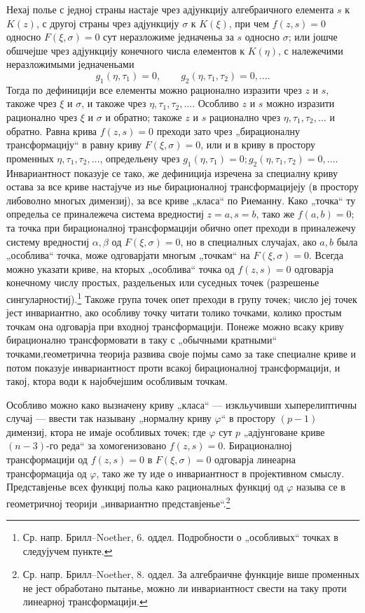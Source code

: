 ﻿\documentclass[11pt]{article}
\begin{document}
Нехај полье с једној страны настаје чрез адјункцију алгебраичного елемента \(s\) к \(K(z)\), с другој страны чрез адјункцију \(\sigma\) к \(K(\xi)\), при чем \(f(z,s)=0\) односно \(F(\xi,\sigma)=0\) сут неразложиме једначеньа за \(s\) односно \(\sigma\); или јошче обшчејше чрез адјункцију конечного числа елементов к \(K(\eta)\), с належечими неразложимыми једначеньами
\[
g_1(\eta,\tau_1)=0,\qquad g_2(\eta,\tau_1,\tau_2)=0,\ldots .
\]
Тогда по дефиницији все елементы можно рационално изразити чрез \(z\) и \(s\), такоже чрез \(\xi\) и \(\sigma\), и такоже чрез \(\eta,\tau_1,\tau_2,\ldots\). Особливо \(z\) и \(s\) можно изразити рационално чрез \(\xi\) и \(\sigma\) и обратно; такоже \(z\) и \(s\) рационално чрез \(\eta,\tau_1,\tau_2,\ldots\) и обратно. Равна крива \(f(z,s)=0\) преходи зато чрез „бирационалну трансформацију“ в равну криву \(F(\xi,\sigma)=0\), или и в криву в простору променных \(\eta,\tau_1,\tau_2,\ldots\), определьену чрез \(g_1(\eta,\tau_1)=0; g_2(\eta,\tau_1,\tau_2)=0,\ldots\). Инвариантност показује се тако, же дефиниција изречена за специалну криву остава за все криве настајуче из нье бирационалној трансформацијеју (в простору либоволно многых димензиј), за все криве „класа“ по Риеманну. Како „точка“ ту определьа се приналежеча система вредностиј \(z=a,s=b\), тако же \(f(a,b)=0\); та точка при бирационалној трансформацији обично опет преходи в приналежечу систему вредностиј \(\alpha,\beta\) од \(F(\xi,\sigma)=0\), но в специалных случајах, ако \(a,b\) была „особлива“ точка, може одговарјати многым „точкам“ на \(F(\xi,\sigma)=0\). Всегда можно указати криве, на кторых „особлива“ точка од \(f(z,s)=0\) одговарја конечному числу простых, раздельеных или суседных точек (разрешенье сингуларностиј).\footnote{Ср. напр. Брилл--Noether, 6. оддел. Подробности о „особливых“ точках в следујучем пункте.} Такоже група точек опет преходи в групу точек; число јеј точек јест инвариантно, ако особливу точку читати толико точками, колико простым точкам она одговарја при входној трансформацији. Понеже можно всаку криву бирационално трансформовати в таку с „обычными кратными“ точками,\footnotemark[\value{footnote}] геометрична теорија развива своје појмы само за таке специалне криве и потом показује инвариантност проти всакој бирационалној трансформацији, и такој, ктора води к најобчејшим особливым точкам.

Особливо можно како вызначену криву „класа“ --- изкльучивши хыперелиптичны случај --- ввести так называну „нормалну криву \(\varphi\)“ в простору \((p-1)\) димензиј, ктора не имаје особливых точек; где \(\varphi\) сут \(p\) „адјунговане криве \((n-3)\)-го реда“ за хомогенизовано \(f(z,s)=0\). Бирационалној трансформацији од \(f(z,s)=0\) в \(F(\xi,\sigma)=0\) одговарја линеарна трансформација од \(\varphi\), тако же ту иде о инвариантност в пројективном смыслу. Представјенье всех функциј польа како рационалных функциј од \(\varphi\) называ се в геометричној теорији „инвариантно представјенье“.\footnote{Ср. напр. Брилл--Noether, 8. оддел. За алгебраичне функције више променных не јест обработано пытанье, можно ли инвариантност свести на таку проти линеарној трансформацији.}
\end{document}
